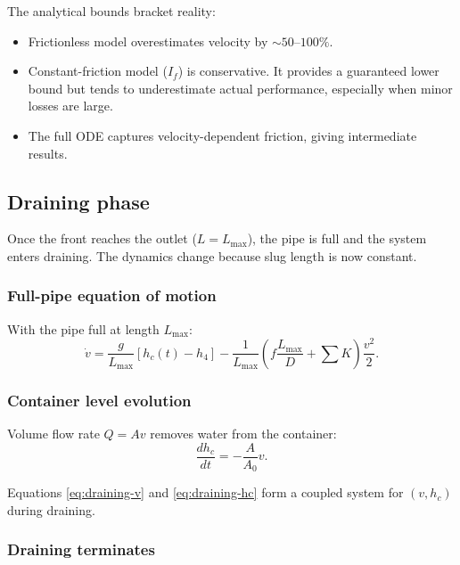 \documentclass[11pt]{article}
\begin{document}
The analytical bounds bracket reality:
\begin{itemize}[nosep,leftmargin=2em]
  \item Frictionless model overestimates velocity by $\sim 50$--$100\%$.
  \item Constant-friction model ($I_f$) is conservative. It provides a guaranteed lower bound but tends to underestimate actual performance, especially when minor losses are large.
  \item The full ODE captures velocity-dependent friction, giving intermediate results.
\end{itemize}

\subsection{Draining phase}
\label{sec:draining}

Once the front reaches the outlet ($L = L_{\max}$), the pipe is full and the system enters draining. The dynamics change because slug length is now constant.

\subsubsection{Full-pipe equation of motion}

With the pipe full at length $L_{\max}$:
\begin{equation}
  \dot{v} = \frac{g}{L_{\max}}[h_c(t) - h_4] - \frac{1}{L_{\max}}\left(f\frac{L_{\max}}{D} + \sum K\right)\frac{v^2}{2}.
  \label{eq:draining-v}
\end{equation}

\subsubsection{Container level evolution}

Volume flow rate $Q = Av$ removes water from the container:
\begin{equation}
  \frac{dh_c}{dt} = -\frac{A}{A_0}v.
  \label{eq:draining-hc}
\end{equation}

Equations \eqref{eq:draining-v} and \eqref{eq:draining-hc} form a coupled system for $(v, h_c)$ during draining.

\subsubsection{Draining terminates}
\end{document}
